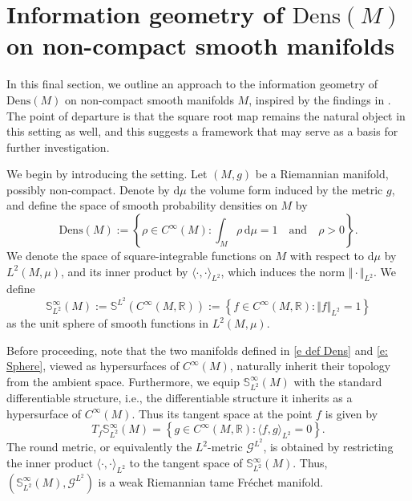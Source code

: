 \documentclass[12pt]{amsart}
\numberwithin{figure}{section}
\numberwithin{table}{section}
\numberwithin{equation}{section}
\def\S{\mathbb{S}}
\def\RR{\mathbb{R}}
\begin{document}
\section{Information geometry of \(\mathrm{Dens}(M)\) on non-compact smooth manifolds}\label{S:5}

In this final section, we outline an approach to the information geometry of \(\mathrm{Dens}(M)\) on non-compact smooth manifolds \(M\), inspired by the findings in . The point of departure is that the square root map remains the natural object in this setting as well, and this suggests a framework that may serve as a basis for further investigation.

We begin by introducing the setting. Let \((M, g)\) be a Riemannian manifold, possibly non-compact. Denote by \(\mathrm{d}\mu\) the volume form induced by the metric \(g\), and define the space of smooth probability densities on \(M\) by
\begin{equation}\label{e def Dens}
    \mathrm{Dens}(M) := \left\{ \rho \in C^{\infty}(M) : \int_M \rho\, \mathrm{d}\mu = 1 \quad \text{and} \quad \rho > 0 \right\}.
\end{equation}
We denote the space of square-integrable functions on \(M\) with respect to \(\mathrm{d}\mu\) by \(L^2(M, \mu)\), and its inner product by \(\langle \cdot, \cdot \rangle_{L^2}\), which induces the norm \(\Vert \cdot \Vert_{L^2}\). We define
\begin{equation}\label{e: Sphere}
    \S_{L^2}^{\infty}(M):= \S^{L^2}(C^{\infty}(M,\RR)) := \left\{ f \in C^{\infty}(M,\RR) : \Vert f \Vert_{L^2} = 1 \right\}
\end{equation}
as the unit sphere of smooth functions in \(L^2(M,\mu)\).

Before proceeding, note that the two manifolds defined in \eqref{e def Dens} and \eqref{e: Sphere}, viewed as hypersurfaces of \(C^{\infty}(M)\), naturally inherit their topology from the ambient space. Furthermore, we equip \(\S_{L^2}^{\infty}(M)\) with the standard differentiable structure, i.e., the differentiable structure it inherits as a hypersurface of \(C^{\infty}(M)\). Thus its tangent space at the point \(f\) is given by
\[
T_f \S_{L^2}^{\infty}(M)= \left\{g\in C^{\infty}(M,\RR): \langle f,g \rangle_{L^2}=0\right\}. 
\]
The round metric, or equivalently the \(L^2\)-metric \(\mathcal{G}^{L^2}\), is obtained by restricting the inner product \(\langle \cdot, \cdot \rangle_{L^2}\) to the tangent space of \(\S_{L^2}^{\infty}(M)\). Thus, \((\S_{L^2}^{\infty}(M), \mathcal{G}^{L^2})\) is a weak Riemannian tame Fréchet manifold.
\end{document}
